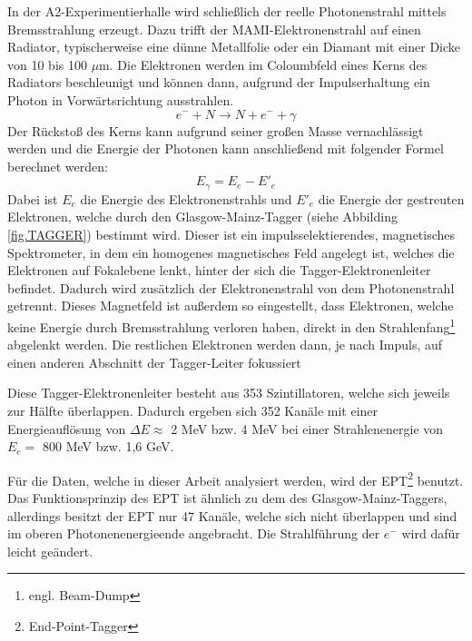 \documentclass[a4paper,11pt,oneside,final,german,openbib,pdftex]{scrbook}
\begin{document}
{ In der A2-Experimentierhalle wird schlie{\ss}lich der reelle Photonenstrahl mittels Bremsstrahlung erzeugt. Dazu trifft der MAMI-Elektronenstrahl auf einen Radiator, typischerweise eine d\"unne Metallfolie oder ein Diamant mit einer Dicke von 10 bis 100 $\mu$m. Die Elektronen werden im Coloumbfeld eines Kerns des Radiators beschleunigt und k\"onnen dann, aufgrund der Impulserhaltung ein Photon in Vorw\"artsrichtung ausstrahlen.
 \begin{equation}
 e^{-}+N\rightarrow N + e^{-}+\gamma
 \label{eq.Streuung}
 \end{equation}
  Der R\"ucksto{\ss} des Kerns kann aufgrund seiner gro{\ss}en Masse vernachl\"assigt werden und die Energie der Photonen kann anschlie{\ss}end mit folgender Formel berechnet werden:
  \begin{equation}
  E_{\gamma}= E_{e^{}}-E{'}_{e}
  \label{eq.Photonenenergie}
  \end{equation}
 Dabei ist $E_e$ die Energie des Elektronenstrahls und $E'_{e}$ die Energie der gestreuten Elektronen, welche durch den Glasgow-Mainz-Tagger (siehe Abbilding \ref{fig.TAGGER}) bestimmt wird.
 Dieser ist ein impulsselektierendes, magnetisches Spektrometer, in dem ein homogenes magnetisches Feld angelegt ist, welches die Elektronen auf Fokalebene lenkt, hinter der sich die Tagger-Elektronenleiter befindet. Dadurch wird zus\"atzlich der Elektronenstrahl von dem Photonenstrahl getrennt. Dieses Magnetfeld ist außerdem so eingestellt, dass Elektronen, welche keine Energie durch Bremsstrahlung verloren haben, direkt in den Strahlenfang\footnote{engl. Beam-Dump} abgelenkt werden. Die restlichen Elektronen werden dann, je nach Impuls, auf einen anderen Abschnitt der Tagger-Leiter fokussiert
 
 Diese Tagger-Elektronenleiter besteht aus 353 Szintillatoren, welche sich jeweils zur H\"alfte \"uberlappen.
 Dadurch ergeben sich 352 Kan\"ale mit einer Energieaufl\"osung von $\Delta E \approx$  2 MeV bzw. 4 MeV bei einer Strahlenenergie von $E_e=$ 800 MeV bzw. 1,6 GeV. 
 
 F\"ur die Daten, welche in dieser Arbeit analysiert werden, wird der EPT\footnote{End-Point-Tagger} benutzt. Das Funktionsprinzip des EPT ist \"ahnlich zu dem des Glasgow-Mainz-Taggers, allerdings besitzt der EPT nur 47 Kan\"ale, welche sich nicht \"uberlappen und sind im oberen Photonenenergieende angebracht. Die Strahlf\"uhrung der $e^-$ wird daf\"ur leicht ge\"andert.
 
}
\end{document}
